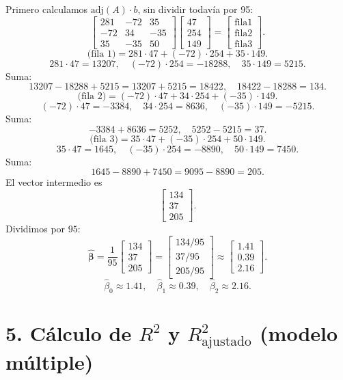 \documentclass[10pt,a4paper]{article}
\begin{document}
Primero calculamos 
\(\mathrm{adj}(A)\cdot b\),
sin dividir todavía por 95:
\[
\begin{bmatrix}
281 & -72 & 35\\
-72 & 34 & -35\\
35 & -35 & 50
\end{bmatrix}
\begin{bmatrix}
47\\
254\\
149
\end{bmatrix}
=
\begin{bmatrix}
\text{fila1}\\
\text{fila2}\\
\text{fila3}
\end{bmatrix}.
\]
\[
\text{(fila 1)} 
= 281\cdot47 + (-72)\cdot254 + 35\cdot149.
\]
\[
281\cdot47=13207,\quad
(-72)\cdot254=-18288,\quad
35\cdot149=5215.
\]
Suma:
\[
13207 -18288 +5215= 13207 +5215=18422,\quad 18422-18288=134.
\]
\[
\text{(fila 2)}
= (-72)\cdot47 +34\cdot254 +(-35)\cdot149.
\]
\[
(-72)\cdot47=-3384,\quad
34\cdot254=8636,\quad
(-35)\cdot149=-5215.
\]
Suma:
\[
-3384+8636=5252,\quad 5252-5215=37.
\]
\[
\text{(fila 3)}
= 35\cdot47 +(-35)\cdot254 +50\cdot149.
\]
\[
35\cdot47=1645,\quad
(-35)\cdot254=-8890,\quad
50\cdot149=7450.
\]
Suma:
\[
1645-8890 +7450=9095-8890=205.
\]
El vector intermedio es
\[
\begin{bmatrix}
134\\
37\\
205
\end{bmatrix}.
\]
Dividimos por $95$:
\[
\hat{\boldsymbol{\beta}}
=
\frac{1}{95}
\begin{bmatrix}
134\\
37\\
205
\end{bmatrix}
=
\begin{bmatrix}
134/95\\
37/95\\
205/95
\end{bmatrix}
\approx
\begin{bmatrix}
1.41\\
0.39\\
2.16
\end{bmatrix}.
\]
\[
\boxed{
\hat{\beta}_0 \approx 1.41,
\quad
\hat{\beta}_1 \approx 0.39,
\quad
\hat{\beta}_2 \approx 2.16.
}
\]


\section*{5. Cálculo de $R^2$ y $R_{\text{ajustado}}^2$ (modelo múltiple)}
\end{document}

